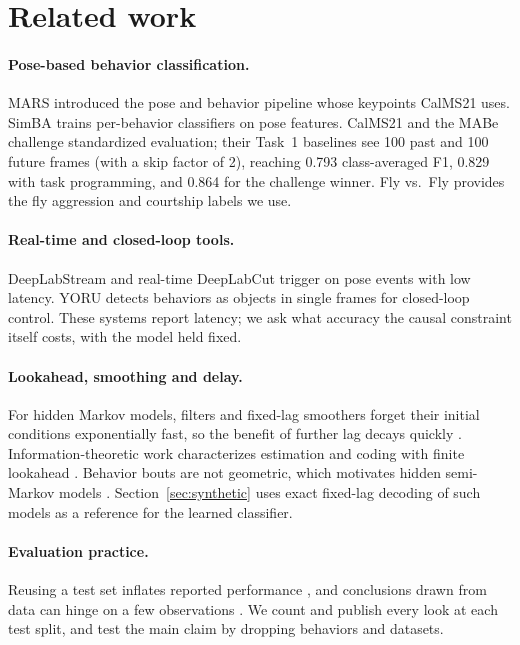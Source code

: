 \documentclass[10pt]{article}
\begin{document}
\section{Related work}

\paragraph{Pose-based behavior classification.} MARS \citep{segalin2021mars} introduced the pose and behavior pipeline whose keypoints CalMS21 uses. SimBA \citep{goodwin2024simba} trains per-behavior classifiers on pose features. CalMS21 and the MABe challenge \citep{sun2021calms21} standardized evaluation; their Task~1 baselines see 100 past and 100 future frames (with a skip factor of 2), reaching 0.793 class-averaged F1, 0.829 with task programming, and 0.864 for the challenge winner. Fly vs.\ Fly \citep{eyjolfsdottir2014flyvsfly} provides the fly aggression and courtship labels we use.

\paragraph{Real-time and closed-loop tools.} DeepLabStream \citep{schweihoff2021deeplabstream} and real-time DeepLabCut \citep{kane2020realtime} trigger on pose events with low latency. YORU \citep{yamanouchi2026yoru} detects behaviors as objects in single frames for closed-loop control. These systems report latency; we ask what accuracy the causal constraint itself costs, with the model held fixed.

\paragraph{Lookahead, smoothing and delay.} For hidden Markov models, filters and fixed-lag smoothers forget their initial conditions exponentially fast, so the benefit of further lag decays quickly \citep{shue1998exponential}. Information-theoretic work characterizes estimation and coding with finite lookahead \citep{venkat2016lookahead,asnani2013lookahead}. Behavior bouts are not geometric, which motivates hidden semi-Markov models \citep{yu2010hsmm}. Section~\ref{sec:synthetic} uses exact fixed-lag decoding of such models as a reference for the learned classifier.

\paragraph{Evaluation practice.} Reusing a test set inflates reported performance \citep{dwork2015reusable,recht2019imagenet}, and conclusions drawn from data can hinge on a few observations \citep{broderick2020amip}. We count and publish every look at each test split, and test the main claim by dropping behaviors and datasets.
\end{document}
